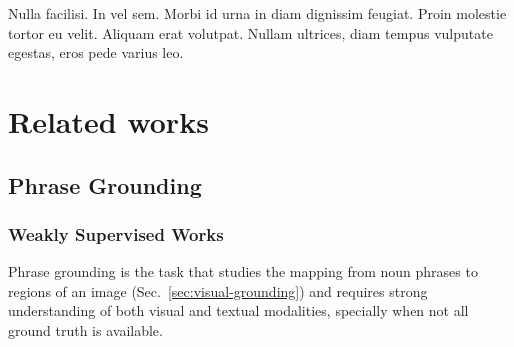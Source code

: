 \begin{savequote}[75mm]
Nulla facilisi. In vel sem. Morbi id urna in diam dignissim feugiat. Proin molestie tortor eu velit. Aliquam erat volutpat. Nullam ultrices, diam tempus vulputate egestas, eros pede varius leo.
\end{savequote}

\chapter{Related works}

\section{Phrase Grounding}

\subsection{Weakly Supervised Works}

Phrase grounding is the task that studies the mapping from noun
phrases to regions of an image (Sec.~\ref{sec:visual-grounding}) and
requires strong understanding of both visual and textual modalities,
specially when not all ground truth is available. 

